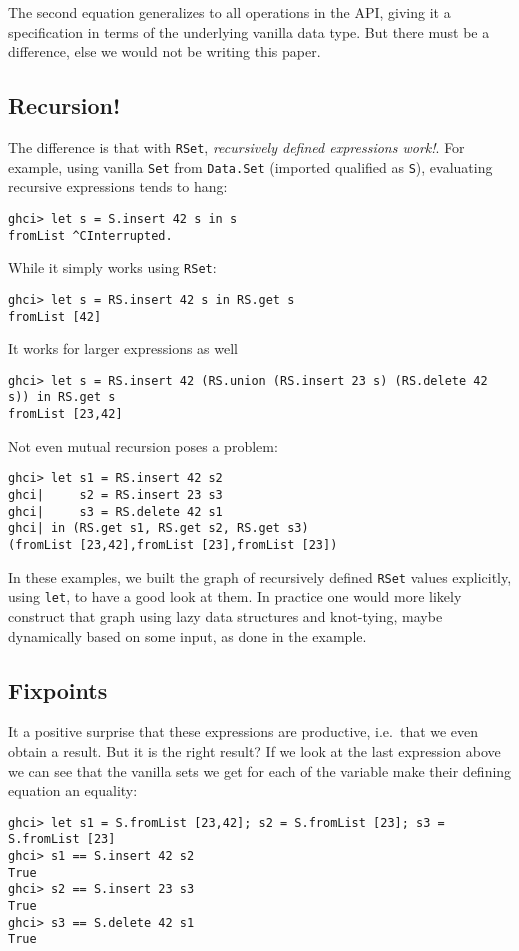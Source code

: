 \documentclass[manuscript,screen,acmsmall]{acmart}
\begin{document}
The second equation generalizes to all operations in the API, giving it a specification in terms of the underlying vanilla data type. But there must be a difference, else we would not be writing this paper.

\subsection{Recursion!}

The difference is that with \verb|RSet|, \emph{recursively defined expressions work!}. For example, using vanilla \verb|Set| from \verb|Data.Set| (imported qualified as \verb|S|), evaluating recursive expressions tends to hang:
\begin{verbatim}
ghci> let s = S.insert 42 s in s
fromList ^CInterrupted.
\end{verbatim}
While it simply works using  \verb|RSet|:
\begin{verbatim}
ghci> let s = RS.insert 42 s in RS.get s
fromList [42]
\end{verbatim}
It works for larger expressions as well
\begin{verbatim}
ghci> let s = RS.insert 42 (RS.union (RS.insert 23 s) (RS.delete 42 s)) in RS.get s
fromList [23,42]
\end{verbatim}
Not even mutual recursion poses a problem:
\begin{verbatim}
ghci> let s1 = RS.insert 42 s2
ghci|     s2 = RS.insert 23 s3
ghci|     s3 = RS.delete 42 s1
ghci| in (RS.get s1, RS.get s2, RS.get s3)
(fromList [23,42],fromList [23],fromList [23])
\end{verbatim}

In these examples, we built the graph of recursively defined \verb|RSet| values explicitly, using \verb|let|, to have a good look at them. In practice one would more likely construct that graph using lazy data structures and knot-tying, maybe dynamically based on some input, as done in the example.

\subsection{Fixpoints}

It a positive surprise that these expressions are productive, i.e.\ that we even obtain a result. But it is the right result? If we look at the last expression above we can see that the vanilla sets we get for each of the variable make their defining equation an equality:
\begin{verbatim}
ghci> let s1 = S.fromList [23,42]; s2 = S.fromList [23]; s3 = S.fromList [23]
ghci> s1 == S.insert 42 s2
True
ghci> s2 == S.insert 23 s3
True
ghci> s3 == S.delete 42 s1
True
\end{verbatim}
\end{document}
